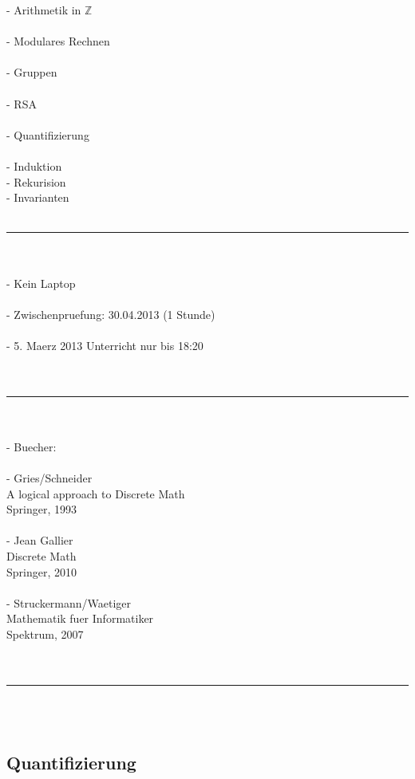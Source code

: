 \documentclass[18pt,a4paper]{article}
\newcommand{\tab}{\hspace*{2em}}
\begin{document}
- Arithmetik in $\mathbb{Z}$\\
\\
- Modulares Rechnen\\
\\
- Gruppen\\
\\
- RSA\\
\\
- Quantifizierung\\
\\
- Induktion\\
\tab - Rekurision\\
\tab - Invarianten\\
\\
\rule{\textwidth}{0.4mm}\\
\\
- Kein Laptop\\
\\
- Zwischenpruefung: 30.04.2013 (1 Stunde)\\
\\
- 5. Maerz 2013 Unterricht nur bis 18:20\\
\\
\\
\rule{\textwidth}{0.4mm}\\
\\
- Buecher:\\
\\
\tab - Gries/Schneider\\
\tab \tab A logical approach to Discrete Math\\
\tab \tab Springer, 1993\\
\\
\tab - Jean Gallier\\
\tab \tab Discrete Math\\
\tab \tab Springer, 2010\\
\\
\tab - Struckermann/Waetiger\\
\tab \tab Mathematik fuer Informatiker\\
\tab \tab Spektrum, 2007\\
\\
\\
\rule{\textwidth}{0.4mm}\\
\\



\subsection{Quantifizierung}
\end{document}
